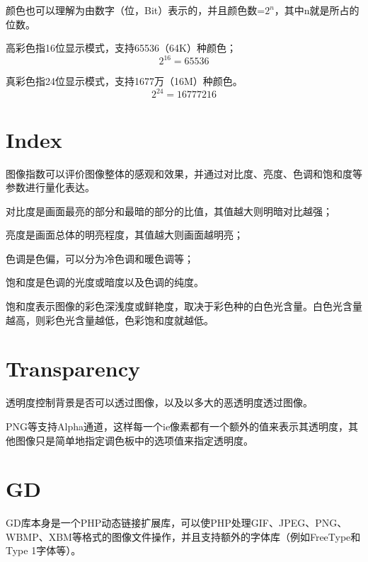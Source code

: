 颜色也可以理解为由数字（位，Bit）表示的，并且颜色数=$2^n$，其中n就是所占的位数。

\begin{compactitem}
\item 高彩色指16位显示模式，支持65536（64K）种颜色；
\[2^{16}=65536\]
\item 真彩色指24位显示模式，支持1677万（16M）种颜色。
\[2^{24}=16777216\]
\end{compactitem}

\section{Index}


图像指数可以评价图像整体的感观和效果，并通过对比度、亮度、色调和饱和度等参数进行量化表达。

\begin{compactitem}
\item 对比度是画面最亮的部分和最暗的部分的比值，其值越大则明暗对比越强；
\item 亮度是画面总体的明亮程度，其值越大则画面越明亮；
\item 色调是色偏，可以分为冷色调和暖色调等；
\item 饱和度是色调的光度或暗度以及色调的纯度。
\end{compactitem}

饱和度表示图像的彩色深浅度或鲜艳度，取决于彩色种的白色光含量。白色光含量越高，则彩色光含量越低，色彩饱和度就越低。


\section{Transparency}

透明度控制背景是否可以透过图像，以及以多大的恶透明度透过图像。

PNG等支持Alpha通道，这样每一个ie像素都有一个额外的值来表示其透明度，其他图像只是简单地指定调色板中的选项值来指定透明度。







\section{GD}


GD库本身是一个PHP动态链接扩展库，可以使PHP处理GIF、JPEG、PNG、WBMP、XBM等格式的图像文件操作，并且支持额外的字体库（例如FreeType和Type 1字体等）。



